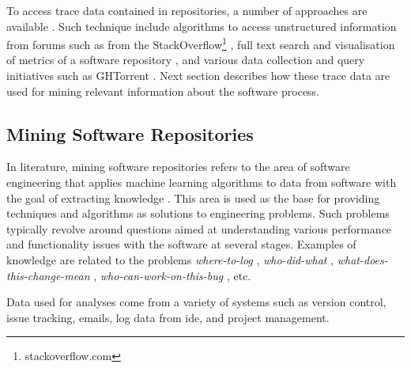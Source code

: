 To access trace data contained in repositories, a number of approaches are available \citep{Voinea2006b,DBLP:conf/icse/GousiosS17,DBLP:conf/icse/OrtuDKM15,DBLP:conf/msr/PonzanelliBPOL14}. Such technique include algorithms to access unstructured information from forums such as from the StackOverflow\footnote{stackoverflow.com} \citep{DBLP:journals/spe/HuPZXGY20}, full text search and visualisation of metrics of a software repository \citep{DBLP:conf/vissoft/FeinerA18}, and various data collection and query initiatives such as GHTorrent \citep{DBLP:conf/msr/GousiosS12}. Next section describes how these trace data are used for mining relevant information about the software process. 




\subsection{Mining Software Repositories}
\label{sec:msr}


In literature, mining software repositories refers to the area of software engineering that applies machine learning algorithms to data from software with the goal of extracting knowledge \citep{DBLP:journals/smr/KagdiCM07,hassan2008road}. This area is used as the base for providing techniques and algorithms as solutions to engineering problems. Such problems typically revolve around questions aimed at understanding various performance \citep{Chen2016} and functionality issues \citep{Farias2016} with the software at several stages. Examples of knowledge are related to the problems \emph{where-to-log} \citep{DBLP:conf/msr/CandidoHAD21}, \emph{who-did-what} \citep{DBLP:conf/msr/YoungCMTHB21}, \emph{what-does-this-change-mean} \citep{DBLP:conf/iwpc/FluriG06} , \emph{who-can-work-on-this-bug} \citep{DBLP:conf/iwpc/KagdiP09}, etc. 


Data used for analyses come from a variety of systems such as version control, issue tracking, emails, log data from \gls{ide}, and project management.

